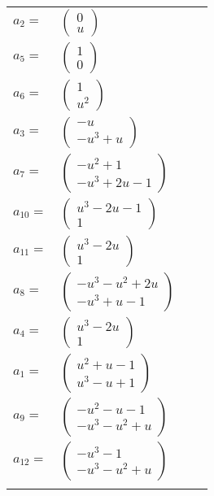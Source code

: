 \documentclass[1p]{elsarticle_modified}
\theoremstyle{definition}
\begin{document}
\begin{tabular}{m{7pt} m{180pt} m{7pt} m{180pt} }
\flushright $a_{2}=$&$\begin{pmatrix}0\\u\end{pmatrix}$ \\
\flushright $a_{5}=$&$\begin{pmatrix}1\\0\end{pmatrix}$ \\
\flushright $a_{6}=$&$\begin{pmatrix}1\\u^2\end{pmatrix}$ \\
\flushright $a_{3}=$&$\begin{pmatrix}- u\\- u^3+u\end{pmatrix}$ \\
\flushright $a_{7}=$&$\begin{pmatrix}- u^2+1\\- u^3+2 u-1\end{pmatrix}$ \\
\flushright $a_{10}=$&$\begin{pmatrix}u^3-2 u-1\\1\end{pmatrix}$ \\
\flushright $a_{11}=$&$\begin{pmatrix}u^3-2 u\\1\end{pmatrix}$ \\
\flushright $a_{8}=$&$\begin{pmatrix}- u^3- u^2+2 u\\- u^3+u-1\end{pmatrix}$ \\
\flushright $a_{4}=$&$\begin{pmatrix}u^3-2 u\\1\end{pmatrix}$ \\
\flushright $a_{1}=$&$\begin{pmatrix}u^2+u-1\\u^3- u+1\end{pmatrix}$ \\
\flushright $a_{9}=$&$\begin{pmatrix}- u^2- u-1\\- u^3- u^2+u\end{pmatrix}$ \\
\flushright $a_{12}=$&$\begin{pmatrix}- u^3-1\\- u^3- u^2+u\end{pmatrix}$\\&\end{tabular}
\end{document}

